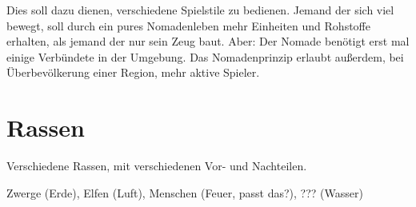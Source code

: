 Dies soll dazu dienen, verschiedene Spielstile zu bedienen. Jemand der sich viel bewegt, soll durch ein pures Nomadenleben mehr Einheiten und Rohstoffe erhalten, als jemand der nur sein Zeug baut. Aber: Der Nomade benötigt erst mal einige Verbündete in der Umgebung. Das Nomadenprinzip erlaubt außerdem, bei Überbevölkerung einer Region, mehr aktive Spieler.


\section{Rassen}
Verschiedene Rassen, mit verschiedenen Vor- und Nachteilen.

Zwerge (Erde), Elfen (Luft), Menschen (Feuer, passt das?), ??? (Wasser) 